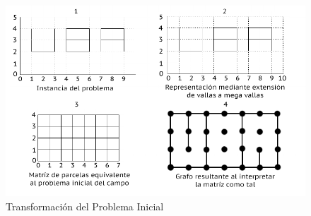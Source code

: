 \clearpage

\begin{figure}[h]
\centering                                                       
        \includegraphics[width=320pt]{./figs/mapeoParcelas.png}
	\caption{Transformación del Problema Inicial}
	\label{fig:ej2Mapeo}
\end{figure}

